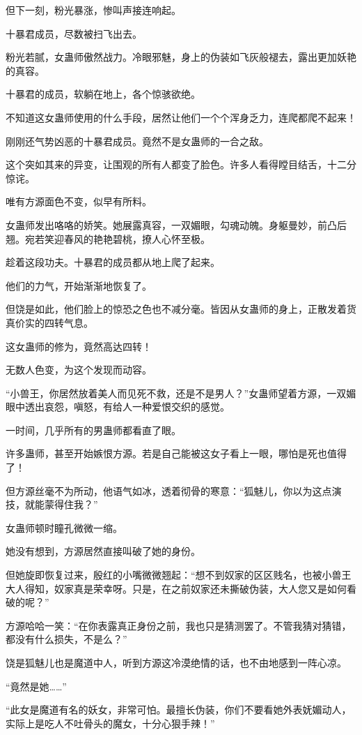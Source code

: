 \begin{this_body}
但下一刻，粉光暴涨，惨叫声接连响起。

十暴君成员，尽数被扫飞出去。

粉光若腻，女蛊师傲然战力。冷眼邪魅，身上的伪装如飞灰般褪去，露出更加妖艳的真容。

十暴君的成员，软躺在地上，各个惊骇欲绝。

不知道这女蛊师使用的什么手段，居然让他们一个个浑身乏力，连爬都爬不起来！

刚刚还气势凶恶的十暴君成员。竟然不是女蛊师的一合之敌。

这个突如其来的异变，让围观的所有人都变了脸色。许多人看得瞠目结舌，十二分惊诧。

唯有方源面色不变，似早有所料。

女蛊师发出咯咯的娇笑。她展露真容，一双媚眼，勾魂动魄。身躯曼妙，前凸后翘。宛若笑迎春风的艳艳碧桃，撩人心怀至极。

趁着这段功夫。十暴君的成员都从地上爬了起来。

他们的力气，开始渐渐地恢复了。

但饶是如此，他们脸上的惊恐之色也不减分毫。皆因从女蛊师的身上，正散发着货真价实的四转气息。

这女蛊师的修为，竟然高达四转！

无数人色变，为这个发现而动容。

“小兽王，你居然放着美人而见死不救，还是不是男人？”女蛊师望着方源，一双媚眼中透出哀怨，嗔怒，有给人一种爱恨交织的感觉。

一时间，几乎所有的男蛊师都看直了眼。

许多蛊师，甚至开始嫉恨方源。若是自己能被这女子看上一眼，哪怕是死也值得了！

但方源丝毫不为所动，他语气如冰，透着彻骨的寒意：“狐魅儿，你以为这点演技，就能蒙得住我？”

女蛊师顿时瞳孔微微一缩。

她没有想到，方源居然直接叫破了她的身份。

但她旋即恢复过来，殷红的小嘴微微翘起：“想不到奴家的区区贱名，也被小兽王大人得知，奴家真是荣幸呀。只是，在之前奴家还未撕破伪装，大人您又是如何看破的呢？”

方源哈哈一笑：“在你表露真正身份之前，我也只是猜测罢了。不管我猜对猜错，都没有什么损失，不是么？”

饶是狐魅儿也是魔道中人，听到方源这冷漠绝情的话，也不由地感到一阵心凉。

“竟然是她……”

“此女是魔道有名的妖女，非常可怕。最擅长伪装，你们不要看她外表妩媚动人，实际上是吃人不吐骨头的魔女，十分心狠手辣！”


\end{this_body}
